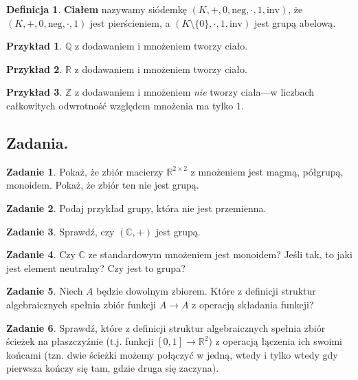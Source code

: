 \documentclass{book}
\theoremstyle{definition}
\newtheorem{definition}{Definicja}[section]
\newtheorem{example}{Przykład}[section]
\newtheorem{exercise}{Zadanie}[section]
\begin{document}
\begin{definition}
	\textbf{Ciałem} nazywamy siódemkę $(K, +, 0, \mathrm{neg}, \cdot, 1, \mathrm{inv})$,
		że $(K, +, 0, \mathrm{neg}, \cdot, 1)$ jest pierścieniem,
		a $(K \setminus \{0\}, \cdot, 1, \mathrm{inv})$ jest grupą abelową.
\end{definition}

\begin{example}
	$\mathbb{Q}$ z dodawaniem i mnożeniem tworzy ciało.
\end{example}

\begin{example}
	$\mathbb{R}$ z dodawaniem i mnożeniem tworzy ciało.
\end{example}

\begin{example}
	$\mathbb{Z}$ z dodawaniem i mnożeniem \textit{nie} tworzy ciała---w liczbach całkowitych
		odwrotność względem mnożenia ma tylko $1$.
\end{example}

\subsection{Zadania.}

\begin{exercise}
	Pokaż, że zbiór macierzy $\mathbb{R}^{2 \times 2}$ z mnożeniem
		jest magmą, półgrupą, monoidem.
	Pokaż, że zbiór ten nie jest grupą.
\end{exercise}

\begin{exercise}
	Podaj przykład grupy, która nie jest przemienna.
\end{exercise}

\begin{exercise}
	Sprawdź, czy $(\mathbb{C}, +)$ jest grupą.
\end{exercise}

\begin{exercise}
	Czy $\mathbb{C}$ ze standardowym mnożeniem jest monoidem? Jeśli tak, to jaki jest element neutralny? Czy jest to grupa?
\end{exercise}

\begin{exercise}
	Niech $A$ będzie dowolnym zbiorem.
	Które z definicji struktur algebraicznych spełnia zbiór funkcji $A \to A$ z operacją składania funkcji?
\end{exercise}

\begin{exercise}
	Sprawdź,
		które z definicji struktur algebraicznych spełnia zbiór ścieżek na płaszczyźnie
		(t.j. funkcji $[0, 1] \to \mathbb{R}^2$) z operacją łączenia ich swoimi końcami
		(tzn. dwie ścieżki możemy połączyć w jedną,
			wtedy i tylko wtedy gdy pierwsza kończy się tam,
			gdzie druga się zaczyna).
\end{exercise}
\end{document}
